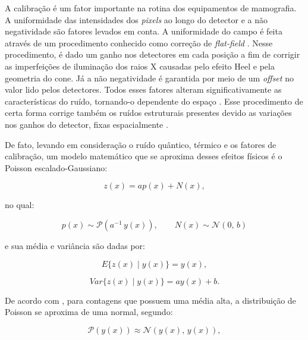 A calibração é um fator importante na rotina dos equipamentos de mamografia. A uniformidade das intensidades dos \textit{pixels} ao longo do detector e a não negatividade são fatores levados em conta. A uniformidade do campo é feita através de um procedimento conhecido como correção de \textit{flat-field} \cite{marshall2017handbook}. Nesse procedimento, é dado um ganho nos detectores em cada posição a fim de corrigir as imperfeições de iluminação dos raios X causadas pelo efeito Heel e pela geometria do cone. Já a não negatividade é garantida por meio de um \textit{offset} no valor lido pelos detectores. Todos esses fatores alteram significativamente as características do ruído, tornando-o  dependente do espaço \cite{borges2017pipeline,borges2017method, borges2018restoration,brito2018application,guerrero2018}. Esse procedimento de certa forma corrige também os ruídos estruturais presentes devido as variações nos ganhos do detector, fixas espacialmente \cite{VanEngen2013,marshall2017handbook}.

De fato, levando em consideração o ruído quântico, térmico e os fatores de calibração, um modelo matemático que se aproxima desses efeitos físicos é o Poisson escalado-Gaussiano:

\begin{equation}
z(x) = ap(x) + N(x),
\label{eq:eqCapRuidoPossionGaussiano}
\end{equation}

\noindent no qual:

\begin{equation}
p(x) \sim \mathcal{P}(a^{-1}\,y(x)),  \qquad  N(x) \sim \mathcal{N}(0,\,b)
\label{eq:eqCapRuidoPossionGaussiano1}
\end{equation}

\noindent e sua média e variância são dadas por:

\begin{equation}
E\{z(x)\mid y(x)\} =  y(x),
\label{eq:eqCapRuidoPossionGaussianoMedia}
\end{equation}

\begin{equation}
Var\{z(x)\mid y(x)\} = ay(x) + b.
\label{eq:eqCapRuidoPossionGaussianoVar}
\end{equation}

De acordo com , para contagens que possuem uma média alta, a distribuição de Poisson se aproxima de uma normal, segundo:

\begin{equation}
\mathcal{P}(y(x)) \approx \mathcal{N}(y(x),\,y(x)),
\label{eq:eqCapRuidoPossionGaussianoAproximacao}
\end{equation}

